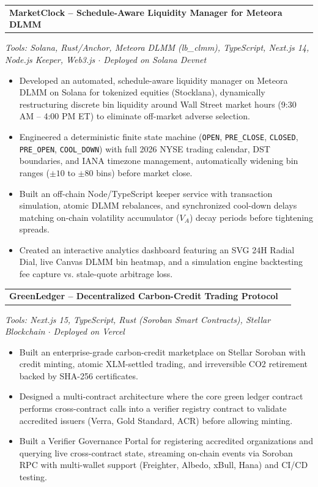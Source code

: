 \documentclass[letterpaper,10pt]{article}
\makeatletter
\newcommand{\resumeItem}[1]{
  \item\small{
    {#1 \vspace{-1.5pt}}
  }
}
\newcommand{\resumeProjectHeading}[2]{
    \vspace{-2pt}\item
    \begin{tabular*}{0.98\textwidth}{l@{\extracolsep{\fill}}r}
      \textbf{#1} & \textit{\small #2} \\
    \end{tabular*}\vspace{-6pt}
}
\newcommand{\resumeItemListStart}{\begin{itemize}[leftmargin=0.15in, label={$\bullet$}]}
\newcommand{\resumeItemListEnd}{\end{itemize}\vspace{-4pt}}
\makeatother
\begin{document}
    \resumeProjectHeading
      {MarketClock -- Schedule-Aware Liquidity Manager for Meteora DLMM}{}
      \vspace{1pt}
      {\small\textit{\color{toolsblue}Tools: Solana, Rust/Anchor, Meteora DLMM (lb\_clmm), TypeScript, Next.js 14, Node.js Keeper, Web3.js $\cdot$ Deployed on Solana Devnet}}
      \resumeItemListStart
        \resumeItem{Developed an automated, schedule-aware liquidity manager on Meteora DLMM on Solana for tokenized equities (Stocklana), dynamically restructuring discrete bin liquidity around Wall Street market hours (9:30 AM -- 4:00 PM ET) to eliminate off-market adverse selection.}
        \resumeItem{Engineered a deterministic finite state machine (\texttt{OPEN}, \texttt{PRE\_CLOSE}, \texttt{CLOSED}, \texttt{PRE\_OPEN}, \texttt{COOL\_DOWN}) with full 2026 NYSE trading calendar, DST boundaries, and IANA timezone management, automatically widening bin ranges ($\pm10$ to $\pm80$ bins) before market close.}
        \resumeItem{Built an off-chain Node/TypeScript keeper service with transaction simulation, atomic DLMM rebalances, and synchronized cool-down delays matching on-chain volatility accumulator ($V_A$) decay periods before tightening spreads.}
        \resumeItem{Created an interactive analytics dashboard featuring an SVG 24H Radial Dial, live Canvas DLMM bin heatmap, and a simulation engine backtesting fee capture vs. stale-quote arbitrage loss.}
      \resumeItemListEnd

    \resumeProjectHeading
      {GreenLedger -- Decentralized Carbon-Credit Trading Protocol}{}
      \vspace{1pt}
      {\small\textit{\color{toolsblue}Tools: Next.js 15, TypeScript, Rust (Soroban Smart Contracts), Stellar Blockchain $\cdot$ Deployed on Vercel}}
      \resumeItemListStart
        \resumeItem{Built an enterprise-grade carbon-credit marketplace on Stellar Soroban with credit minting, atomic XLM-settled trading, and irreversible CO2 retirement backed by SHA-256 certificates.}
        \resumeItem{Designed a multi-contract architecture where the core green ledger contract performs cross-contract calls into a verifier registry contract to validate accredited issuers (Verra, Gold Standard, ACR) before allowing minting.}
        \resumeItem{Built a Verifier Governance Portal for registering accredited organizations and querying live cross-contract state, streaming on-chain events via Soroban RPC with multi-wallet support (Freighter, Albedo, xBull, Hana) and CI/CD testing.}
      \resumeItemListEnd
\end{document}
